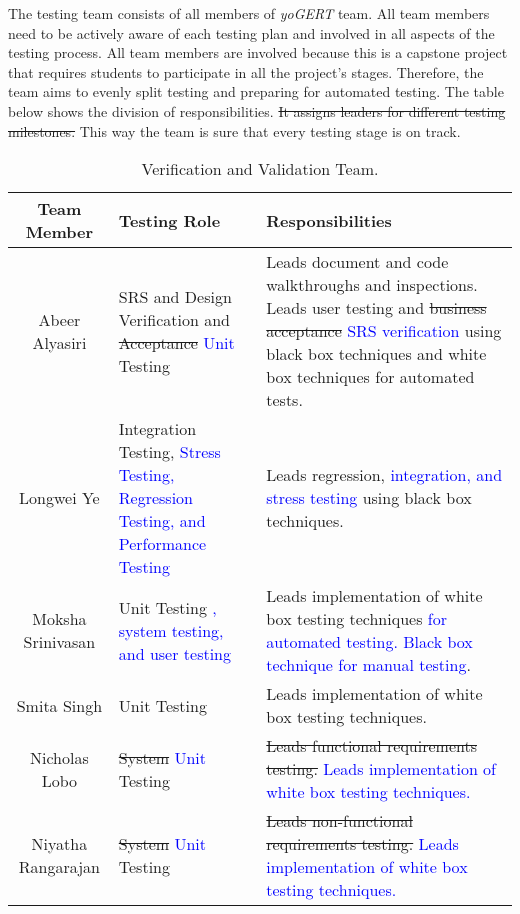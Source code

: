 \documentclass[12pt, titlepage]{article}
\begin{document}
The testing team consists of all members of \emph{yoGERT} team. All team members
need to be actively aware of each testing plan and involved in all aspects of the
testing process. All team members are involved because this is a capstone project
that requires students to participate in all the project's stages. Therefore, the
team aims to evenly split testing and preparing for automated testing. The table
below shows the division of responsibilities. \sout{It assigns leaders for different
testing milestones.} This way the team is sure that every testing stage is on
track.  
\newpage
\begin{table}[h!]
    \begin{tabular}{|c|p{50mm}|p{50mm}| }
 \hline
 \textbf{Team Member} & \textbf{Testing Role} & \textbf{Responsibilities}  \\ 
 \hline
 Abeer Alyasiri & SRS and Design Verification and \sout{Acceptance} \textcolor{blue}{Unit} Testing & Leads document and code walkthroughs and inspections. Leads user testing and \sout{business acceptance} \textcolor{blue}{SRS verification} using black box techniques and white box techniques for automated tests. \\ 
 Longwei Ye & Integration Testing, \textcolor{blue}{Stress Testing, Regression Testing, and Performance Testing} & Leads regression, \textcolor{blue}{integration, and stress testing} using black box techniques. \\ 
 Moksha Srinivasan & Unit Testing \textcolor{blue}{, system testing, and user testing} & Leads implementation of white box testing techniques \textcolor{blue}{for automated testing. Black box technique for manual testing}. \\
 Smita Singh & Unit Testing & Leads implementation of white box testing techniques. \\
 Nicholas Lobo & \sout{System} \textcolor{blue}{Unit} Testing & \sout{Leads functional requirements testing.} \textcolor{blue}{Leads implementation of white box testing techniques.} \\
 Niyatha Rangarajan & \sout{System} \textcolor{blue}{Unit} Testing & \sout{Leads non-functional requirements testing.} \textcolor{blue}{Leads implementation of white box testing techniques.} \\
 \hline
\end{tabular}
    \caption{Verification and Validation Team.}
    \label{tab:my_label}
\end{table}
\end{document}
